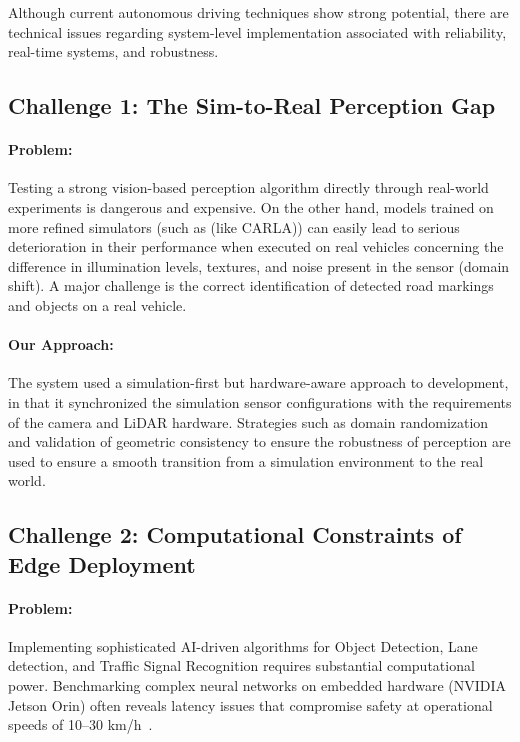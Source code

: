 \documentclass[12pt, a4paper]{report}
\begin{document}
Although current autonomous driving techniques show strong potential, there are technical issues regarding system-level implementation associated with reliability, real-time systems, and robustness.

\subsection{Challenge 1: The Sim-to-Real Perception Gap}

\paragraph{Problem:}
Testing a strong vision-based perception algorithm directly through real-world experiments is dangerous and expensive. On the other hand, models trained on more refined simulators (such as (like \ac{CARLA})) can easily lead to serious deterioration in their performance when executed on real vehicles concerning the difference in illumination levels, textures, and noise present in the sensor (domain shift). A major challenge is the correct identification of detected road markings and objects on a real vehicle.

\paragraph{Our Approach:}
The system used a simulation-first but hardware-aware approach to development, in that it synchronized the simulation sensor configurations with the requirements of the camera and \ac{LiDAR} hardware. Strategies such as domain randomization and validation of geometric consistency to ensure the robustness of perception are used to ensure a smooth transition from a simulation environment to the real world.

\subsection{Challenge 2: Computational Constraints of Edge Deployment}

\paragraph{Problem:}
Implementing sophisticated AI-driven algorithms for Object Detection, Lane detection, and Traffic Signal Recognition requires substantial computational power. Benchmarking complex neural networks on embedded hardware (NVIDIA Jetson Orin) often reveals latency issues that compromise safety at operational speeds of 10--30 km/h~\cite{ref2}.
\end{document}
